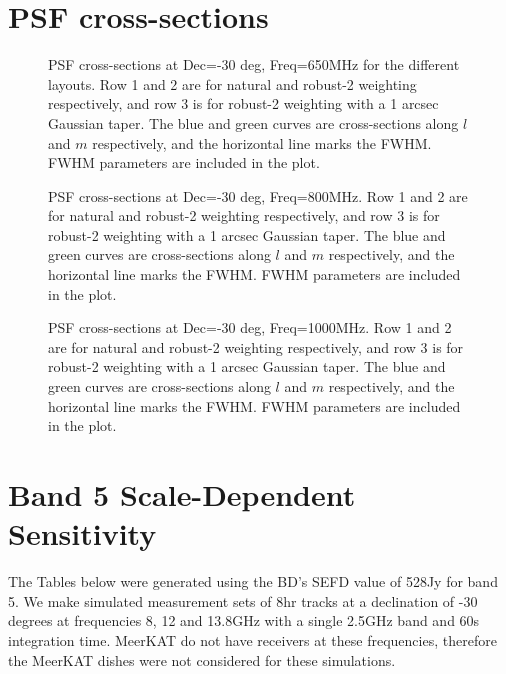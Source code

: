\documentclass[sfheadings,a4paper,times,9pt,floats,floatfix]{article}
\begin{document}
\section{PSF cross-sections}\label{app:psf}
\begin{figure}[H]
 \tiny{}
 \caption{PSF cross-sections at Dec=-30 deg, Freq=650MHz for the different layouts. Row 1 and 2 are for natural and robust-2
weighting respectively, and row
3 is for robust-2 weighting with a 1 arcsec Gaussian taper. The blue and green curves are cross-sections along $l$ and $m$
respectively, and the horizontal line marks the FWHM. FWHM parameters are included in the plot.}
\end{figure}
\begin{figure}[H]
 \tiny{}
 \caption{PSF cross-sections at Dec=-30 deg, Freq=800MHz. Row 1 and 2 are for natural and robust-2 weighting respectively, and 
row
3 is for robust-2 weighting with a 1 arcsec Gaussian taper. The blue and green curves are cross-sections along $l$ and $m$
respectively, and the horizontal line marks the FWHM. FWHM parameters are included in the plot.}
\end{figure}
\begin{figure}[H]
 \tiny{}
 \caption{PSF cross-sections at Dec=-30 deg, Freq=1000MHz. Row 1 and 2 are for natural and robust-2 weighting respectively, and
row
3 is for robust-2 weighting with a 1 arcsec Gaussian taper. The blue and green curves are cross-sections along $l$ and $m$
respectively, and the horizontal line marks the FWHM. FWHM parameters are included in the plot.}
\end{figure}
\section{Band 5 Scale-Dependent Sensitivity}\label{sec:band5}
The Tables below were generated using the BD's SEFD value of 528Jy for band 5. We make simulated measurement sets of 8hr tracks
at a declination of -30 degrees at frequencies 8, 12 and 13.8GHz with a single 2.5GHz band and 60s integration time. MeerKAT do
not have receivers at these frequencies, therefore the MeerKAT dishes were not considered for these simulations.








\end{document}
